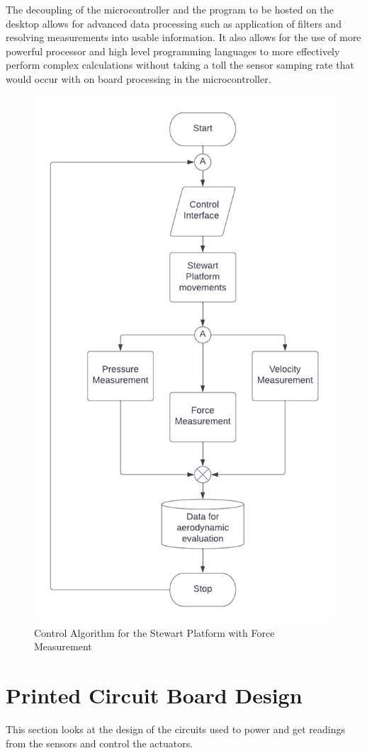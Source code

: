 The decoupling of the microcontroller and the program to be hosted on the desktop allows for advanced data processing such as application of filters and resolving measurements into usable information. It also allows for the use of more powerful processor and high level programming languages to more effectively perform complex calculations without taking a toll the sensor samping rate that would occur with on board processing in the microcontroller.
\begin{center}
	\begin{figure}[!h]
	\centering
	\includegraphics[width=0.7\linewidth]{Figures/Fig14}
	\caption[Control Algorithm]{Control Algorithm for the Stewart Platform with Force Measurement}
	\end{figure}
\end{center}
\section{Printed Circuit Board Design}
This section looks at the design of the circuits used to power and get readings from the sensors and control the actuators.

